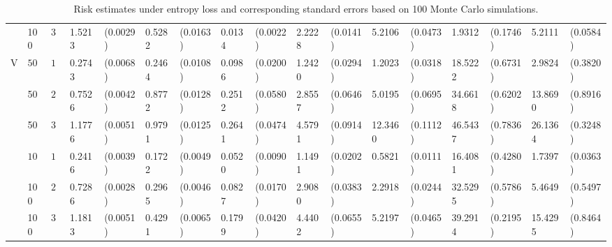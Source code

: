 \begin{table}[H]
\begin{footnotesize}
\begin{tabular}{lllllllllllllllll}
    & 100  & $30$ & 1.5213 & (0.0029) & 0.5282 & (0.0163) & 0.0134 & (0.0022) & 2.2228 & (0.0141) & 5.2106 & (0.0473) & 1.9312 & (0.1746) & 5.2111 & (0.0584) \\ 
  V & $50$ & $10$ & 0.2743 & (0.0068) & 0.2464 & (0.0108) & 0.0986 & (0.0200) & 1.2420 & (0.0294) & 1.2023 & (0.0318) & 18.5222 & (0.6731) & 2.9824 & (0.3820) \\ 
    &  50 & $20$ & 0.7526 & (0.0042) & 0.8772 & (0.0128) & 0.2512 & (0.0580) & 2.8557 & (0.0646) & 5.0195 & (0.0695) & 34.6618 & (0.6202) & 13.8690 & (0.8916) \\ 
    & 50  & $30$ & 1.1776 & (0.0051) & 0.9791 & (0.0125) & 0.2641 & (0.0474) & 4.5791 & (0.0914) & 12.3460 & (0.1112) & 46.5437 & (0.7836) & 26.1364 & (0.3248) \\ 
    & $100$ & $10$ & 0.2416 & (0.0039) & 0.1722 & (0.0049) & 0.0520 & (0.0090) & 1.1491 & (0.0202) & 0.5821 & (0.0111) & 16.4081 & (0.4280) & 1.7397 & (0.0363) \\ 
    &  100 & $20$ & 0.7286 & (0.0028) & 0.2965 & (0.0046) & 0.0827 & (0.0170) & 2.9080 & (0.0383) & 2.2918 & (0.0244) & 32.5295 & (0.5786) & 5.4649 & (0.5497) \\ 
    & 100  & $30$ & 1.1813 & (0.0051) & 0.4291 & (0.0065) & 0.1799 & (0.0420) & 4.4402 & (0.0655) & 5.2197 & (0.0465) & 39.2914 & (0.2195) & 15.4295 & (0.8464) \\ 
   \hline
\end{tabular}
\end{footnotesize}
\caption{Risk estimates under entropy loss and corresponding standard errors based on
                              100 Monte Carlo simulations.} 
\end{table}
